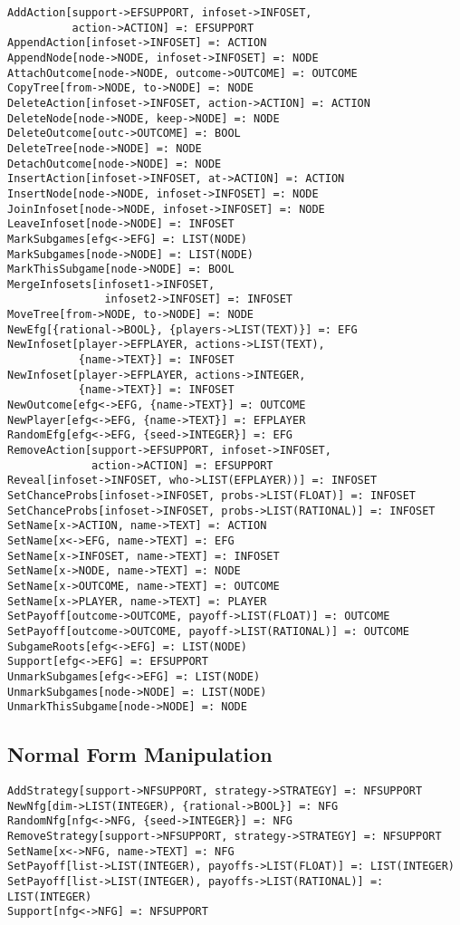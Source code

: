 \begin{verbatim}
AddAction[support->EFSUPPORT, infoset->INFOSET, 
          action->ACTION] =: EFSUPPORT
AppendAction[infoset->INFOSET] =: ACTION
AppendNode[node->NODE, infoset->INFOSET] =: NODE
AttachOutcome[node->NODE, outcome->OUTCOME] =: OUTCOME
CopyTree[from->NODE, to->NODE] =: NODE
DeleteAction[infoset->INFOSET, action->ACTION] =: ACTION
DeleteNode[node->NODE, keep->NODE] =: NODE
DeleteOutcome[outc->OUTCOME] =: BOOL
DeleteTree[node->NODE] =: NODE
DetachOutcome[node->NODE] =: NODE
InsertAction[infoset->INFOSET, at->ACTION] =: ACTION
InsertNode[node->NODE, infoset->INFOSET] =: NODE
JoinInfoset[node->NODE, infoset->INFOSET] =: NODE
LeaveInfoset[node->NODE] =: INFOSET
MarkSubgames[efg<->EFG] =: LIST(NODE)
MarkSubgames[node->NODE] =: LIST(NODE)
MarkThisSubgame[node->NODE] =: BOOL
MergeInfosets[infoset1->INFOSET,
               infoset2->INFOSET] =: INFOSET
MoveTree[from->NODE, to->NODE] =: NODE
NewEfg[{rational->BOOL}, {players->LIST(TEXT)}] =: EFG
NewInfoset[player->EFPLAYER, actions->LIST(TEXT),
           {name->TEXT}] =: INFOSET
NewInfoset[player->EFPLAYER, actions->INTEGER,
           {name->TEXT}] =: INFOSET
NewOutcome[efg<->EFG, {name->TEXT}] =: OUTCOME
NewPlayer[efg<->EFG, {name->TEXT}] =: EFPLAYER 
RandomEfg[efg<->EFG, {seed->INTEGER}] =: EFG
RemoveAction[support->EFSUPPORT, infoset->INFOSET, 
             action->ACTION] =: EFSUPPORT
Reveal[infoset->INFOSET, who->LIST(EFPLAYER))] =: INFOSET
SetChanceProbs[infoset->INFOSET, probs->LIST(FLOAT)] =: INFOSET
SetChanceProbs[infoset->INFOSET, probs->LIST(RATIONAL)] =: INFOSET
SetName[x->ACTION, name->TEXT] =: ACTION
SetName[x<->EFG, name->TEXT] =: EFG
SetName[x->INFOSET, name->TEXT] =: INFOSET
SetName[x->NODE, name->TEXT] =: NODE
SetName[x->OUTCOME, name->TEXT] =: OUTCOME
SetName[x->PLAYER, name->TEXT] =: PLAYER
SetPayoff[outcome->OUTCOME, payoff->LIST(FLOAT)] =: OUTCOME
SetPayoff[outcome->OUTCOME, payoff->LIST(RATIONAL)] =: OUTCOME
SubgameRoots[efg<->EFG] =: LIST(NODE)
Support[efg<->EFG] =: EFSUPPORT
UnmarkSubgames[efg<->EFG] =: LIST(NODE)
UnmarkSubgames[node->NODE] =: LIST(NODE)
UnmarkThisSubgame[node->NODE] =: NODE
\end{verbatim}

\subsection{Normal Form Manipulation}

\begin{verbatim}
AddStrategy[support->NFSUPPORT, strategy->STRATEGY] =: NFSUPPORT
NewNfg[dim->LIST(INTEGER), {rational->BOOL}] =: NFG
RandomNfg[nfg<->NFG, {seed->INTEGER}] =: NFG
RemoveStrategy[support->NFSUPPORT, strategy->STRATEGY] =: NFSUPPORT
SetName[x<->NFG, name->TEXT] =: NFG
SetPayoff[list->LIST(INTEGER), payoffs->LIST(FLOAT)] =: LIST(INTEGER)
SetPayoff[list->LIST(INTEGER), payoffs->LIST(RATIONAL)] =: LIST(INTEGER)
Support[nfg<->NFG] =: NFSUPPORT
\end{verbatim}

